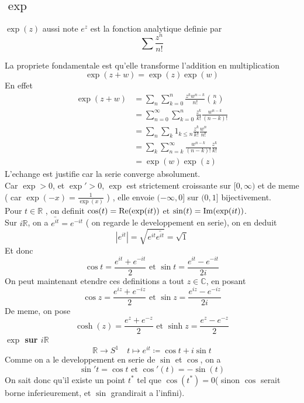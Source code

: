\documentclass[../main.tex]{subfiles}
\begin{document}
\subsection{$\exp$}
\begin{defn}[Exponentielle]
	$\exp ( z) $ aussi note $ e^{z} $ est la fonction analytique definie par
	\[ 
	\sum \frac{z^{n}}{n!}
	\]
	
\end{defn}
La propriete fondamentale est qu'elle transforme l'addition en multiplication
\[ 
	\exp( z+w) = \exp ( z) \exp( w) 
\]
En effet
\begin{align*}
	\exp( z+w) &= \sum_n \sum_{k=0}^{ n} \frac{z^{k} w^{n-k}}{n!} \binom n k\\
		   &= \sum_{n=0}^{ \infty } \sum_{k=0}^{ n} \frac{z^{k}}{k!} \frac{w^{n-k}}{( n-k)!}\\
		   &= \sum_{n}^{ } \sum_{k}^{ } 1_{k \leq n} \frac{z^{k}}{k!} \frac{w^{n}}{n!}\\
		   &= \sum_{k}^{ } \sum_{n=k}^{ \infty } \frac{w^{n-k}}{( n-k) !} \frac{z^{k}}{k!}\\
		   &= \exp( w) \exp ( z) 	
\end{align*}
L'echange est justifie car la serie converge absolument.\\
Car $\exp>0$, et $\exp'>0$, $\exp$ est strictement croissante sur $ [ 0, \infty ) $ et de meme ( car $\exp( -x) = \frac{1}{\exp ( x) }$ ) , elle envoie $( - \infty , 0] $ sur $( 0,1] $ bijectivement.\\
Pour $t \in \mathbb{R}$ , on definit $\cos ( t) = \operatorname{Re}( \exp( it) ) $ et $\sin ( t) =\operatorname{Im}( \exp( it) ) $.\\
Sur $i \mathbb{R}$, on a $ \bar{ e^{it}  }= e^{-it} $ ( on regarde le developpement en serie), on en deduit
\[ 
|e^{it}| = \sqrt { e^{it} \bar {  e^{it} } } = \sqrt{ 1} 	
\]
Et donc
\[ 
\cos t = \frac{ e^{it} + e^{-it} }{2} \text{ et } \sin t= \frac{ e^{it} - e^{-it} }{2i}
\]
On peut maintenant etendre ces definitions a tout $z \in \mathbb{C}$, en posant
\[ 
\cos z = \frac{ e^{iz} + e^{-iz} }{ 2	} \text{ et } \sin z =\frac{ e^{iz} - e^{-iz} }{2i}
\]
De meme, on pose
\[ 
	\cosh ( z) = \frac{ e^{z}+ e^{-z} }{2} \text{ et } \sinh z = \frac{ e^{z}- e^{-z}}{2}	
\]
\textbf { $\exp$ sur $i \mathbb{R}$ } \\
\[ 
\mathbb{R}\to S^{1} \quad t \mapsto e^{it} \coloneqq \cos t + i \sin t		
\]
Comme on a le developpement en serie de $\sin$ et $\cos$, on a 
\[ 
	\sin' t = \cos t \text{ et } \cos'( t) = -\sin ( t) 
\]
On sait donc qu'il existe un point $t^{*}$ tel que $\cos ( t^{*}) =0$( sinon $\cos$ serait borne inferieurement, et $\sin$ grandirait a l'infini).\\
\end{document}
